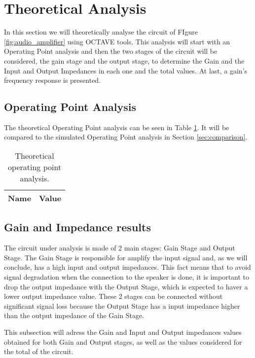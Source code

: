 \newpage
{}
\section{Theoretical Analysis}
\label{sec:analysis}

In this section we will theoretically analyse the circuit of FIgure \ref{fig:audio_amplifier} using OCTAVE tools. This analysis will start with an Operating Point analysis and then the two stages of the circuit will be considered, the gain stage and the output stage, to determine the Gain and the Input and Output Impedances in each one and the total values. At last, a gain's frequency response is presented. 

\subsection{Operating Point Analysis}

The theoretical Operating Point analysis can be seen in Table \ref{tab:teo_op}. It will be compared to the simulated Operating Point analysis in Section \ref{sec:comparison}.

\begin{table}[H]
	\centering
	\begin{tabular}{|l|r|}
		\hline    
		{\bf Name} & {\bf Value} \\ \hline
		
	\end{tabular}
	\caption{Theoretical operating point analysis.}
	\label{tab:teo_op}
\end{table}

\subsection{Gain and Impedance results}

The circuit under analysis is made of 2 main stages: Gain Stage and Output Stage. The Gain Stage is responsible for amplify the input signal and, as we will conclude, has a high input and output impedances. This fact means that to avoid signal degradation when the connection to the speaker is done, it is important to drop the output impedance with the Output Stage, which is expected to haver a lower output impedance value. These 2 stages can be connected without significant signal loss because the Output Stage has a input impedance higher than the output impedance of the Gain Stage.

This subsection will adress the Gain and Input and Output impedances values obtained for both Gain and Output stages, as well as the values considered for the total of the circuit. 

